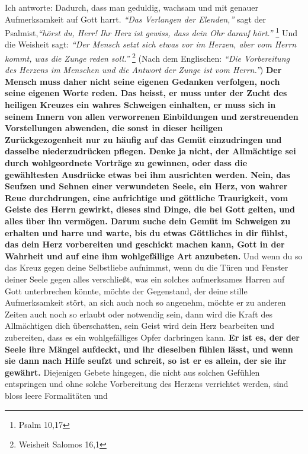  Ich antworte: Dadurch, dass man geduldig,
wachsam und mit genauer Aufmerksamkeit
auf Gott harrt.
\textit{"`Das Verlangen der Elenden,"'} sagt der Psalmist,\textit{"`hörst du,
Herr! Ihr Herz ist gewiss, dass dein Ohr darauf hört."'}
\footnote{Psalm 10,17}
Und die Weisheit sagt:
\textit{"`Der Mensch setzt sich etwas vor im Herzen, aber vom
Herrn kommt, was die Zunge reden soll."'}
\footnote{Weisheit Salomos 16,1}
(Nach dem
Englischen:
\textit{"`Die Vorbereitung des Herzens im Menschen und die Antwort der Zunge
ist vom Herrn."'}) 
\label{ref:06_04_gebetshaltung} \textbf{Der Mensch muss
daher nicht seine eigenen Gedanken verfolgen,
noch seine eigenen Worte reden. Das heisst, er muss unter der Zucht des heiligen
Kreuzes ein wahres Schweigen einhalten, er muss sich in seinem Innern von allen
verworrenen Einbildungen und zerstreuenden Vorstellungen abwenden, die
sonst in dieser heiligen Zurückgezogenheit nur zu häufig auf das Gemüt
einzudringen und dasselbe niederzudrücken pflegen. Denke ja nicht, der
Allmächtige sei durch wohlgeordnete Vorträge zu gewinnen, oder dass die
gewähltesten Ausdrücke etwas bei ihm ausrichten werden. Nein, das Seufzen und
Sehnen einer verwundeten Seele, ein Herz, von wahrer Reue durchdrungen, eine
aufrichtige und göttliche Traurigkeit, vom Geiste des Herrn gewirkt, dieses sind
Dinge, die bei Gott gelten, und alles über ihn vermögen. Darum suche dein Gemüt
im Schweigen zu erhalten und harre und warte, bis du etwas Göttliches in dir
fühlst, das dein Herz vorbereiten und geschickt machen kann, Gott in der
Wahrheit und auf eine ihm wohlgefällige Art anzubeten.} 
Und wenn du so das Kreuz
gegen deine Selbstliebe aufnimmst, wenn du die Türen und Fenster deiner Seele
gegen alles verschließt, was ein solches aufmerksames Harren auf Gott
unterbrechen könnte, möchte der Gegenstand, der deine stille Aufmerksamkeit
stört, an sich auch noch so angenehm, möchte er zu anderen Zeiten auch noch so
erlaubt oder notwendig sein, dann wird die Kraft des Allmächtigen dich
überschatten, sein Geist wird dein Herz bearbeiten und zubereiten, dass es ein
wohlgefälliges Opfer darbringen kann. \textbf{Er ist es, der der Seele ihre
Mängel
aufdeckt, und ihr dieselben fühlen lässt, und wenn sie dann nach Hilfe seufzt
und schreit, so ist er es allein, der sie ihr gewährt.} 
Diejenigen Gebete
hingegen, die nicht aus solchen Gefühlen entspringen und ohne solche
Vorbereitung des Herzens verrichtet werden, sind bloss leere Formalitäten und
